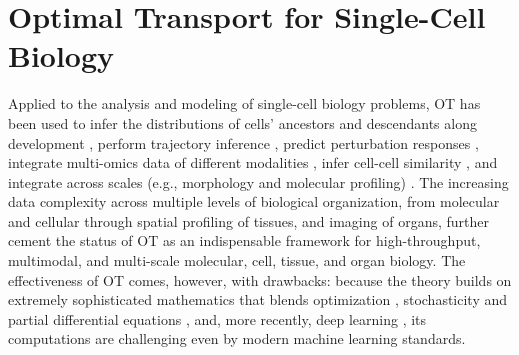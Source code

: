 

\section{Optimal Transport for Single-Cell Biology}
\label{sec:related_work_bio}
\label{sec:ot_for_biology}

Applied to the analysis and modeling of single-cell biology problems, OT has been used to infer the distributions of cells' ancestors and descendants along development \citep{schiebinger2019optimal}, perform trajectory inference \citep{bunne2022proximal, forrow2021lineageot, bunne2022recovering, lavenant2021towards, schiebinger2019optimal, tong2020trajectorynet, yang2020predicting, zhang2021optimal, chizat2022trajectory}, predict perturbation responses \citep{bunne2021learning, yang2018scalable, lubeck2022neural}, integrate multi-omics data of different modalities \citep{demetci2022scot}, infer cell-cell similarity \citep{huizing2022optimal}, and integrate across scales (e.g., morphology and molecular profiling) \citep{yang2021multi}. The increasing data complexity across multiple levels of biological organization, from molecular and cellular through spatial profiling \citep{moriel2021novosparc} of tissues, and imaging of organs, further cement the status of OT as an indispensable framework for high-throughput, multimodal, and multi-scale molecular, cell, tissue, and organ biology. The effectiveness of OT comes, however, with drawbacks: because the theory builds on extremely sophisticated mathematics that blends optimization \citep{cuturi2013sinkhorn, cuturi2022optimal}, stochasticity \citep{chizat2022trajectory, bunne2022recovering} and partial differential equations \citep{bunne2022proximal}, and, more recently, deep learning \citep{tong2020trajectorynet, bunne2021learning, bunne2022supervised, yang2018scalable, lubeck2022neural, yang2021multi}, its computations are challenging even by modern machine learning standards.
